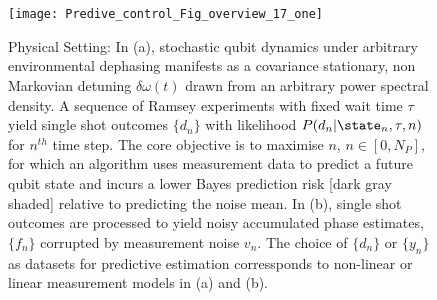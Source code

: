 \\
\\
\begin{figure}[h!]
    \caption{ \label{fig:main:Predive_control_Fig_overview_17_one} Physical Setting: In (a), stochastic qubit dynamics under arbitrary environmental dephasing manifests as a covariance stationary, non Markovian detuning $\delta \omega(t)$ drawn from an arbitrary power spectral density. A sequence of Ramsey experiments with fixed wait time $\tau$ yield single shot outcomes $\{ d_n \}$ with likelihood $P(d_n|\state_n, \tau,n)$ for $n^{th}$ time step. The core objective is to maximise $n$, $n \in [0, N_P]$, for which an algorithm uses measurement data to predict a future qubit state and incurs a lower Bayes prediction risk [dark gray shaded] relative to predicting the noise mean. In (b), single shot outcomes are processed to yield noisy accumulated phase estimates, $\{ f_n\}$ corrupted by measurement noise $v_n$. The choice of $\{d_n\}$ or $\{y_n\}$ as datasets for predictive estimation corressponds to non-linear or linear measurement models in (a) and (b).}
    \texttt{[image: Predive\_control\_Fig\_overview\_17\_one]} 
\end{figure} 

